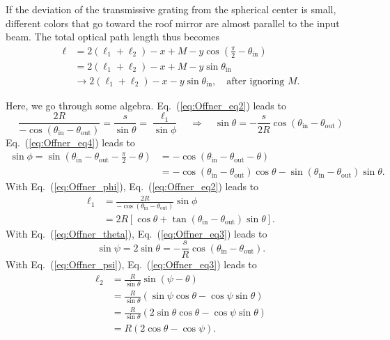 \documentclass[12pt,hidelinks]{book}
\begin{document}
If the deviation of the transmissive grating from the spherical center is small, different colors that go toward the roof mirror are almost parallel to the input beam. The total optical path length thus becomes
\begin{align}
\ell & = 2\left(\ell_1+\ell_2\right)-x+M-y\cos(\frac{\pi}{2}-\theta_{\text{in}}) \nonumber \\
& = 2\left(\ell_1+\ell_2\right)-x+M-y\sin\theta_{\text{in}} \nonumber \\
& \rightarrow 2\left(\ell_1+\ell_2\right)-x-y\sin\theta_{\text{in}},\quad \text{after ignoring }M.
\label{eq:Offner_l}
\end{align}

Here, we go through some algebra. Eq.~(\ref{eq:Offner_eq2}) leads to
\begin{equation}
\frac{2R}{-\cos(\theta_{\text{in}}-\theta_{\text{out}})}=\frac{s}{\sin\theta}=\frac{\ell_1}{\sin\phi}\quad\Rightarrow\quad\sin\theta=-\frac{s}{2R}\cos(\theta_{\text{in}}-\theta_{\text{out}})
\label{eq:Offner_theta}
\end{equation}
Eq.~(\ref{eq:Offner_eq4}) leads to
\begin{align}
\sin\phi = \sin(\theta_{\text{in}}-\theta_{\text{out}}-\frac{\pi}{2}-\theta) & =-\cos(\theta_{\text{in}}-\theta_{\text{out}}-\theta) \nonumber \\
& =-\cos(\theta_{\text{in}}-\theta_{\text{out}})\cos\theta-\sin(\theta_{\text{in}}-\theta_{\text{out}})\sin\theta.
\label{eq:Offner_phi}
\end{align}
With Eq.~(\ref{eq:Offner_phi}), Eq.~(\ref{eq:Offner_eq2}) leads to
\begin{align}
\ell_1 & =\frac{2R}{-\cos(\theta_{\text{in}}-\theta_{\text{out}})}\sin\phi \nonumber \\
& =2R\left[\cos\theta+\tan(\theta_{\text{in}}-\theta_{\text{out}})\sin\theta\right].
\end{align}
With Eq.~(\ref{eq:Offner_theta}), Eq.~(\ref{eq:Offner_eq3}) leads to
\begin{equation}
\sin\psi=2\sin\theta=-\frac{s}{R}\cos(\theta_{\text{in}}-\theta_{\text{out}}).
\label{eq:Offner_psi}
\end{equation}
With Eq.~(\ref{eq:Offner_psi}), Eq.~(\ref{eq:Offner_eq3}) leads to
\begin{align}
\ell_2 & =\frac{R}{\sin\theta}\sin(\psi-\theta) \nonumber \\
& =\frac{R}{\sin\theta}\left(\sin\psi\cos\theta-\cos\psi\sin\theta\right) \nonumber \\
& =\frac{R}{\sin\theta}\left(2\sin\theta\cos\theta-\cos\psi\sin\theta\right) \nonumber \\
& =R\left(2\cos\theta-\cos\psi\right).
\end{align}
\end{document}

